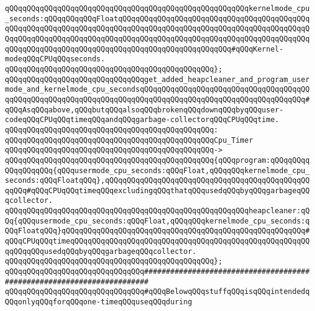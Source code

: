 \verb|qQQqqQQqqQQqqQQqqQQqqQQqqQQqqQQqqQQqqQQqqQQqqQQqqQQqqQQqkernelmode_cpu_seconds:qQQqqQQqqQQqFloatqQQqqQQqqQQqqQQqqQQqqQQqqQQqqQQqqQQqqQQqqQQqqQQqqQQqqQQqqQQqqQQqqQQqqQQqqQQqqQQqqQQqqQQqqQQqqQQqqQQqqQQqqQQqqQQqqQQqqQQqqQQqqQQqqQQqqQQqqQQqqQQqqQQqqQQqqQQqqQQqqQQqqQQqqQQqqQQqqQQqqQQqqQQqqQQqqQQqqQQqqQQqqQQqqQQqqQQqqQQqqQQqqQQqqQQqqQQq#qQQqKernel-modeqQQqCPUqQQqseconds.|\newline
\verb|qQQqqQQqqQQqqQQqqQQqqQQqqQQqqQQqqQQqqQQqqQQqqQQq};|\newline
\newline
\verb|qQQqqQQqqQQqqQQqqQQqqQQqqQQqqQQqget_added_heapcleaner_and_program_usermode_and_kernelmode_cpu_secondsqQQqqQQqqQQqqQQqqQQqqQQqqQQqqQQqqQQqqQQqqQQqqQQqqQQqqQQqqQQqqQQqqQQqqQQqqQQqqQQqqQQqqQQqqQQqqQQqqQQqqQQqqQQq#qQQqAsqQQqabove,qQQqbutqQQqalsoqQQqbrokenqQQqdownqQQqbyqQQquser-codeqQQqCPUqQQqtimeqQQqandqQQqgarbage-collectorqQQqCPUqQQqtime.|\newline
\verb|qQQqqQQqqQQqqQQqqQQqqQQqqQQqqQQqqQQqqQQqqQQqqQQq:|\newline
\verb|qQQqqQQqqQQqqQQqqQQqqQQqqQQqqQQqqQQqqQQqqQQqqQQqCpu_Timer|\newline
\verb|qQQqqQQqqQQqqQQqqQQqqQQqqQQqqQQqqQQqqQQqqQQqqQQq->|\newline
\verb|qQQqqQQqqQQqqQQqqQQqqQQqqQQqqQQqqQQqqQQqqQQqqQQq{qQQqprogram:qQQqqQQqqQQqqQQqqQQq{qQQqusermode_cpu_seconds:qQQqFloat,qQQqqQQqkernelmode_cpu_seconds:qQQqFloatqQQq},qQQqqQQqqQQqqQQqqQQqqQQqqQQqqQQqqQQqqQQqqQQqqQQqqQQq#qQQqCPUqQQqtimeqQQqexcludingqQQqthatqQQqusedqQQqbyqQQqgarbageqQQqcollector.|\newline
\verb|qQQqqQQqqQQqqQQqqQQqqQQqqQQqqQQqqQQqqQQqqQQqqQQqqQQqqQQqheapcleaner:qQQq{qQQqusermode_cpu_seconds:qQQqFloat,qQQqqQQqkernelmode_cpu_seconds:qQQqFloatqQQq}qQQqqQQqqQQqqQQqqQQqqQQqqQQqqQQqqQQqqQQqqQQqqQQqqQQqqQQq#qQQqCPUqQQqtimeqQQqqQQqqQQqqQQqqQQqqQQqqQQqqQQqqQQqqQQqqQQqqQQqqQQqqQQqqQQqqQQqusedqQQqbyqQQqgarbageqQQqcollector.|\newline
\verb|qQQqqQQqqQQqqQQqqQQqqQQqqQQqqQQqqQQqqQQqqQQqqQQq};|\newline
\newline
\newline
\newline
\newline
\verb|qQQqqQQqqQQqqQQqqQQqqQQqqQQqqQQq#######################################################################|\newline
\verb|qQQqqQQqqQQqqQQqqQQqqQQqqQQqqQQq#qQQqBelowqQQqstuffqQQqisqQQqintendedqQQqonlyqQQqforqQQqone-timeqQQquseqQQqduring|\newline

